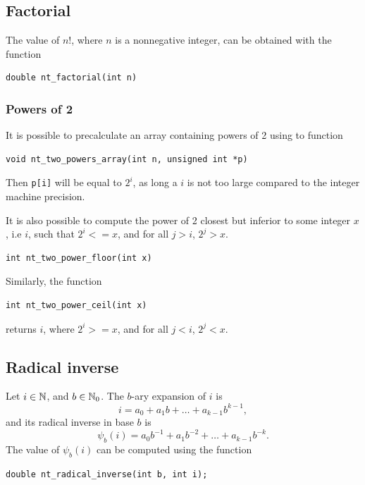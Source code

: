 \subsection{Factorial}

The value of $n!$, where $n$ is a nonnegative integer, can be obtained with the function
\begin{verbatim}
double nt_factorial(int n)
\end{verbatim}

\subsubsection{Powers of 2}

It is possible to precalculate an array containing powers of 2 using
to function
\begin{verbatim}
void nt_two_powers_array(int n, unsigned int *p)
\end{verbatim}
Then \verb|p[i]| will be equal to $2^i$, as long a $i$ is not too
large compared to the integer machine precision.

It is also possible to compute the power of 2 closest but inferior to
some integer $x$, i.e $i$, such that $2^i <= x$, and for all $j > i$, $2^j > x$.
\begin{verbatim}
int nt_two_power_floor(int x)
\end{verbatim}
Similarly, the function
\begin{verbatim}
int nt_two_power_ceil(int x)
\end{verbatim}
returns $i$, where $2^i >= x$, and for all $j < i$, $2^j < x$.

\subsection{Radical inverse}

Let $i \in \mathbb{N}$, and $b \in \mathbb{N}_0$.
The $b$-ary expansion of $i$ is
\[
i = a_0 + a_1b + \ldots + a_{k-1}b^{k-1},
\]
and its radical inverse in base $b$ is
\[
\psi_b(i) = a_0b^{-1} + a_1b^{-2} + \ldots + a_{k-1}b^{-k}.
\]
The value of $\psi_b(i)$ can be computed using the function
\begin{verbatim}
double nt_radical_inverse(int b, int i);
\end{verbatim}
